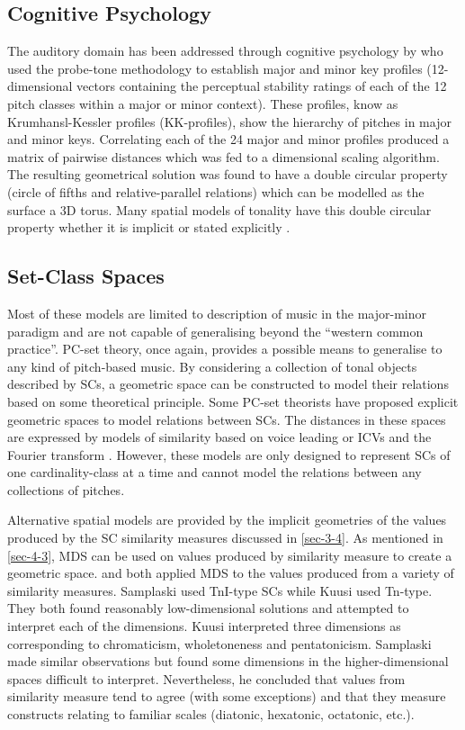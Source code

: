 \documentclass{article}
\begin{document}
\subsection{Cognitive Psychology}
\label{sec-5-3}

The auditory domain has been addressed through cognitive psychology
by \citet{Krumhansl1990} who used the probe-tone methodology
\citep{Krumhansl1979} to establish major and minor key profiles
(12-dimensional vectors containing the perceptual stability ratings of
each of the 12 pitch classes within a major or minor context). These
profiles, know as Krumhansl-Kessler profiles (KK-profiles), show the
hierarchy of pitches in major and minor keys. Correlating each of the
24 major and minor profiles produced a matrix of pairwise distances
which was fed to a dimensional scaling algorithm. The resulting
geometrical solution was found to have a double circular property
(circle of fifths and relative-parallel relations) which can be
modelled as the surface a 3D torus. Many spatial models of tonality
have this double circular property whether it is implicit
\citep{Weber,Schoenberg} or stated explicitly \citep{Lerdahl2001a}.
\subsection{Set-Class Spaces}
\label{sec-5-4}

Most of these models are limited to description of music in the
major-minor paradigm and are not capable of generalising beyond the
``western common practice''. PC-set theory, once again, provides a
possible means to generalise to any kind of pitch-based music. By
considering a collection of tonal objects described by SCs, a
geometric space can be constructed to model their relations based on
some theoretical principle. Some PC-set theorists have proposed
explicit geometric spaces to model relations between SCs. The distances
in these spaces are expressed by models of similarity based on voice
leading \citep{Cohn2003,Tymoczko2012} or ICVs and the Fourier
transform \citep{Quinn2006, Quinn2007}. However, these models are only
designed to represent SCs of one cardinality-class at a time and
cannot model the relations between any collections of pitches.

Alternative spatial models are provided by the implicit geometries of
the values produced by the SC similarity measures discussed in \ref{sec-3-4}. As mentioned in \ref{sec-4-3}, MDS can be
used on values produced by similarity measure to create a geometric
space. \citet{Kuusi2001} and \citet{Samplaski2005a} both applied MDS to
the values produced from a variety of similarity measures. Samplaski
used TnI-type SCs while Kuusi used Tn-type. They both found reasonably
low-dimensional solutions and attempted to interpret each of the
dimensions. Kuusi interpreted three dimensions as corresponding to
chromaticism, wholetoneness and pentatonicism. Samplaski made similar
observations but found some dimensions in the higher-dimensional
spaces difficult to interpret. Nevertheless, he concluded that values
from similarity measure tend to agree (with some exceptions) and that
they measure constructs relating to familiar scales (diatonic,
hexatonic, octatonic, etc.).
\end{document}
